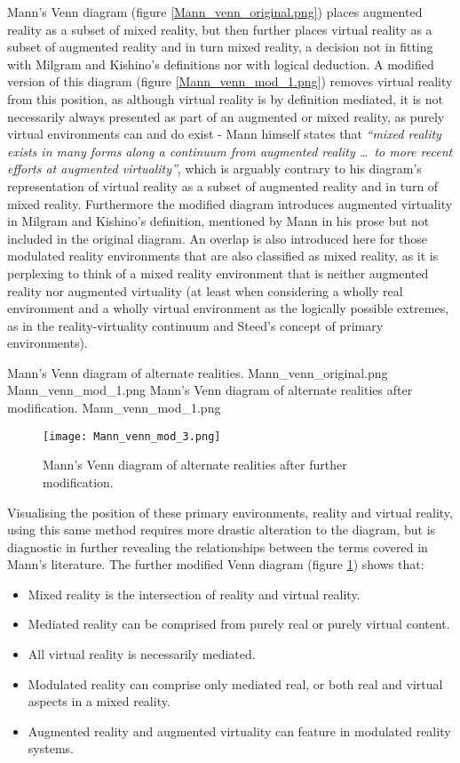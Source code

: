 Mann's Venn diagram (figure \ref{Mann_venn_original.png}) places augmented reality as a subset of mixed reality, but then further places virtual reality as a subset of augmented reality and in turn mixed reality, a decision not in fitting with Milgram and Kishino's definitions nor with logical deduction. A modified version of this diagram (figure \ref{Mann_venn_mod_1.png}) removes virtual reality from this position, as although virtual reality is by definition mediated, it is not necessarily always presented as part of an augmented or mixed reality, as purely virtual environments can and do exist - Mann himself states that \textit{``mixed reality exists in many forms along a continuum from augmented reality \ldots\ to more recent efforts at augmented virtuality''}, which is arguably contrary to his diagram's representation of virtual reality as a subset of augmented reality and in turn of mixed reality. Furthermore the modified diagram introduces augmented virtuality in Milgram and Kishino's definition, mentioned by Mann in his prose but not included in the original diagram. An overlap is also introduced here for those modulated reality environments that are also classified as mixed reality, as it is perplexing to think of a mixed reality environment that is neither augmented reality nor augmented virtuality (at least when considering a wholly real environment and a wholly virtual environment as the logically possible extremes, as in the reality-virtuality continuum and Steed's concept of primary environments).

 {Mann's Venn diagram of alternate realities.} {Mann_venn_original.png}
       {Mann_venn_mod_1.png} {Mann's Venn diagram of alternate realities after modification.} {Mann_venn_mod_1.png}

\begin{figure}[h]
\centering
  \texttt{[image: Mann\_venn\_mod\_3.png]}
  \caption{Mann's Venn diagram of alternate realities after further modification.}
  \label{Mann_venn_mod_3.png}
\end{figure}

Visualising the position of these primary environments, reality and virtual reality, using this same method requires more drastic alteration to the diagram, but is diagnostic in further revealing the relationships between the terms covered in Mann's literature. The further modified Venn diagram (figure \ref{Mann_venn_mod_3.png}) shows that:
\begin{itemize}
	\item Mixed reality is the intersection of reality and virtual reality.
	\item Mediated reality can be comprised from purely real or purely virtual content.
	\item All virtual reality is necessarily mediated.
	\item Modulated reality can comprise only mediated real, or both real and virtual aspects in a mixed reality.
	\item Augmented reality and augmented virtuality can feature in modulated reality systems.
\end{itemize}

